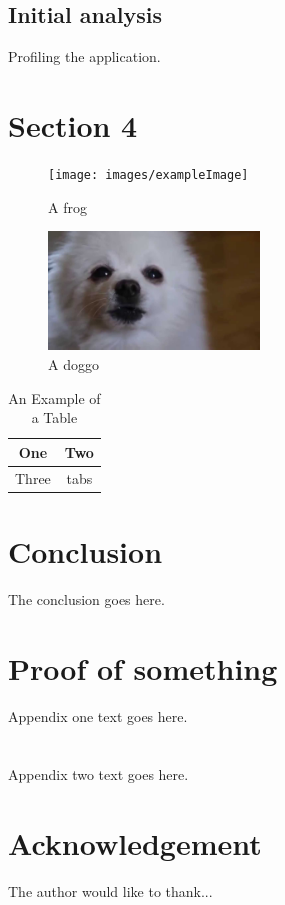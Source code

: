 \documentclass[journal,transmag]{IEEEtran}
\begin{document}
        \subsection{Initial analysis} 
        Profiling the application.
	
\section{Section 4}
	\lipsum[9-10]
	
\begin{figure}[!t]
	\centering
	\texttt{[image: images/exampleImage]}
	\caption{A frog}
	\label{fig_frog}
\end{figure}

\begin{figure}[!t]
	\centering
	\includegraphics[width= 0.5\textwidth]{images/fig2}
        \caption{A doggo}
	\label{fig_pup}
\end{figure}

\begin{table}[!t]
	\renewcommand{\arraystretch}{1.3}
	\caption{An Example of a Table}
	\label{table_example}
	\centering
	\begin{tabular}{|c|c|}
		\hline
		One & Two\\
		\hline
		Three & tabs\\
		\hline
	\end{tabular}
\end{table}

\section{Conclusion}
The conclusion goes here.

\newpage

\appendices
\section{Proof of something}
	Appendix one text goes here.

\section{}
	Appendix two text goes here.

\section*{Acknowledgement}
	The author would like to thank...



\end{document}
